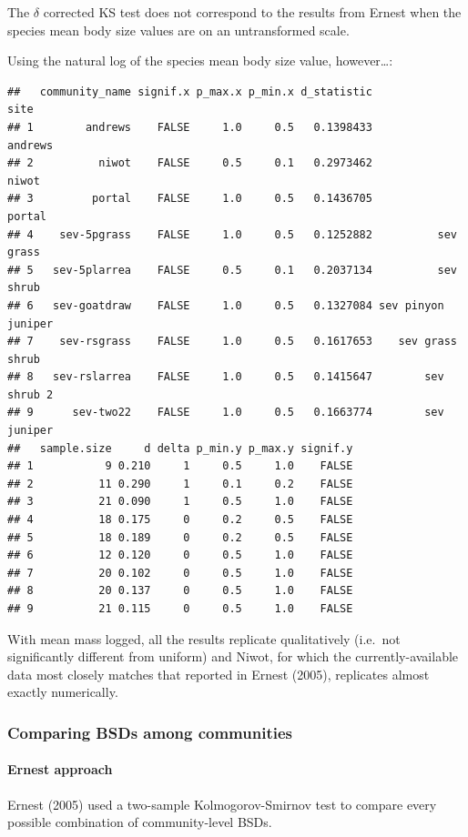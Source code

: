 \documentclass[]{article}
\let\oldparagraph\paragraph
\renewcommand{\paragraph}[1]{\oldparagraph{#1}\mbox{}}
\begin{document}
The \(\delta\) corrected KS test does not correspond to the results from
Ernest when the species mean body size values are on an untransformed
scale.

Using the natural log of the species mean body size value,
however\ldots{}:

\begin{verbatim}
##   community_name signif.x p_max.x p_min.x d_statistic               site
## 1        andrews    FALSE     1.0     0.5   0.1398433            andrews
## 2          niwot    FALSE     0.5     0.1   0.2973462              niwot
## 3         portal    FALSE     1.0     0.5   0.1436705             portal
## 4    sev-5pgrass    FALSE     1.0     0.5   0.1252882          sev grass
## 5   sev-5plarrea    FALSE     0.5     0.1   0.2037134          sev shrub
## 6   sev-goatdraw    FALSE     1.0     0.5   0.1327084 sev pinyon juniper
## 7    sev-rsgrass    FALSE     1.0     0.5   0.1617653    sev grass shrub
## 8   sev-rslarrea    FALSE     1.0     0.5   0.1415647        sev shrub 2
## 9      sev-two22    FALSE     1.0     0.5   0.1663774        sev juniper
##   sample.size     d delta p_min.y p_max.y signif.y
## 1           9 0.210     1     0.5     1.0    FALSE
## 2          11 0.290     1     0.1     0.2    FALSE
## 3          21 0.090     1     0.5     1.0    FALSE
## 4          18 0.175     0     0.2     0.5    FALSE
## 5          18 0.189     0     0.2     0.5    FALSE
## 6          12 0.120     0     0.5     1.0    FALSE
## 7          20 0.102     0     0.5     1.0    FALSE
## 8          20 0.137     0     0.5     1.0    FALSE
## 9          21 0.115     0     0.5     1.0    FALSE
\end{verbatim}

With mean mass logged, all the results replicate qualitatively (i.e.~not
significantly different from uniform) and Niwot, for which the
currently-available data most closely matches that reported in Ernest
(2005), replicates almost exactly numerically.

\subsubsection{Comparing BSDs among
communities}\label{comparing-bsds-among-communities}

\paragraph{Ernest approach}\label{ernest-approach-3}

Ernest (2005) used a two-sample Kolmogorov-Smirnov test to compare every
possible combination of community-level BSDs.
\end{document}
